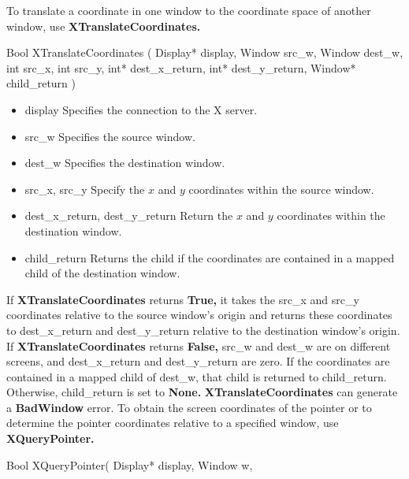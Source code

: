 \documentclass{report}
\begin{document}
\begin{itemize}
            \bigbreak \noindent 
            To translate a coordinate in one window to the coordinate space of another window, use \textbf{XTranslateCoordinates.}
            \bigbreak \noindent 
            \begin{cppcode}
                Bool XTranslateCoordinates (
                    Display* display,
                    Window src_w, Window dest_w,
                    int src_x, int src_y,
                    int* dest_x_return, int* dest_y_return,
                    Window* child_return
            )
            \end{cppcode}
            \begin{itemize}
                \item display Specifies the connection to the X server.
                \item src\_w Specifies the source window.
                \item dest\_w Specifies the destination window.
                \item src\_x, src\_y Specify the $x$ and $y$ coordinates within the source window.
                \item dest\_x\_return, dest\_y\_return Return the $x$ and $y$ coordinates within the destination window.
                \item child\_return Returns the child if the coordinates are contained in a mapped child of the destination window.
            \end{itemize}
            If \textbf{XTranslateCoordinates} returns \textbf{True,} it takes the src\_x and src\_y coordinates relative to the source window’s origin and returns these coordinates to dest\_x\_return and dest\_y\_return relative to the destination window’s origin. If \textbf{XTranslateCoordinates} returns \textbf{False,} src\_w and dest\_w are on different screens, and dest\_x\_return and dest\_y\_return are zero. If the coordinates are contained in a mapped child of dest\_w, that child is returned to child\_return. Otherwise, child\_return is set to \textbf{None.}
            \bigbreak \noindent 
            \textbf{XTranslateCoordinates} can generate a \textbf{BadWindow} error.
            \bigbreak \noindent 
            To obtain the screen coordinates of the pointer or to determine the pointer coordinates relative to a specified window, use \textbf{XQueryPointer.}
            \bigbreak \noindent 
            \begin{cppcode}
                Bool XQueryPointer(
                    Display* display,
                    Window w,

\end{cppcode}
\end{itemize}
\end{document}
